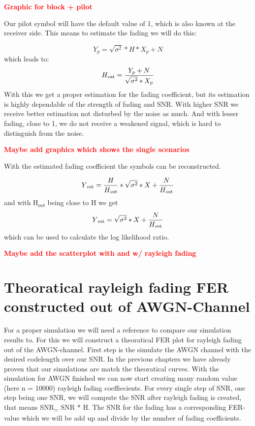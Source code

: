 \documentclass[12pt,oneside, reqno]{report}
\newcommand\boldred[1]{\textcolor{red}{\textbf{#1}}}
\begin{document}
\boldred{Graphic for block + pilot}

Our pilot symbol will have the default value of 1, which is also known at the receiver side. This means to estimate the fading we will do this:

\begin{equation}
\label{eq:fadest}
Y_p = \sqrt{\sigma^2}*H*X_p + N
\end{equation}
which leads to:
\begin{equation}
H\textsubscript{est} = \frac{Y_p + N}{\sqrt{\sigma^2} * X_p}
\end{equation}
With this we get a proper estimation for the fading coefficient, but its estimation is highly dependable of the strength of fading and SNR. With higher SNR we receive better estimation not disturbed by the noise as much. And with lesser fading, close to 1, we do not receive a weakened signal, which is hard to distinguish from the noise. 

\boldred{Maybe add graphics which shows the single scenarios}

With the estimated fading coefficient the symbols can be reconstructed.

\begin{equation}
Y\textsubscript{est} = \frac{H}{H\textsubscript{est}}*\sqrt{\sigma^2}*X + \frac{N}{H\textsubscript{est}}
\end{equation}
and with H\textsubscript{est} being close to H we get
\begin{equation}
Y\textsubscript{est} = \sqrt{\sigma^2}*X + \frac{N}{H\textsubscript{est}}
\end{equation}
which can be used to calculate the log likelihood ratio.

\boldred{Maybe add the scatterplot with and w/ rayleigh fading}

\section{Theoratical rayleigh fading FER constructed out of AWGN-Channel}

For a proper simulation we will need a reference to compare our simulation results to. For this we will construct a theoratical FER plot for rayleigh fading out of the AWGN-channel.
First step is the simulate the AWGN channel with the desired codelength over our SNR. In the previous chapters we have already proven that our simulations are match the theoratical curves. With the simulation for AWGN finished we can now start creating
many random value (here n = 10000) rayleigh fading coeffiecients. For every single step of SNR, one step being one SNR, we will compute the SNR after rayleigh fading is created, that means SNR\textsubscript = SNR * H. The SNR for the fading has a corresponding FER-value which we will be add up and divide by the number of fading coefficients.
\end{document}
